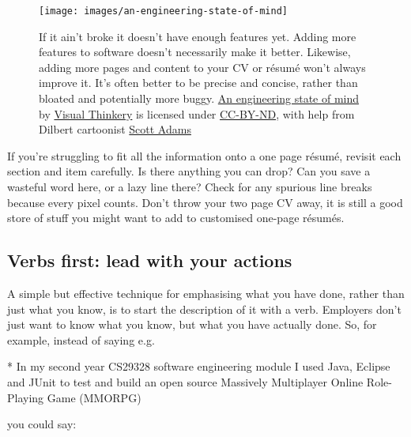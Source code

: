 \documentclass[
]{book}
\newenvironment{Shaded}{\begin{snugshade}}{\end{snugshade}}
\newcommand{\NormalTok}[1]{#1}
\newcommand{\SpecialStringTok}[1]{\textcolor[rgb]{0.31,0.60,0.02}{#1}}
\begin{document}
\begin{figure}

{\centering \texttt{[image: images/an-engineering-state-of-mind]} 

}

\caption{If it ain't broke it doesn't have enough features yet. Adding more features to software doesn't necessarily make it better. Likewise, adding more pages and content to your CV or résumé won't always improve it. It's often better to be precise and concise, rather than bloated and potentially more buggy. \href{https://bryanmmathers.com/an-engineering-state-of-mind/}{An engineering state of mind} by \href{https://visualthinkery.com/}{Visual Thinkery} is licensed under \href{https://creativecommons.org/licenses/by-nd/4.0/}{CC-BY-ND}, with help from Dilbert cartoonist \href{https://en.wikipedia.org/wiki/Scott_Adams}{Scott Adams}}\label{fig:morefeatures-fig}
\end{figure}



If you're struggling to fit all the information onto a one page résumé, revisit each section and item carefully. Is there anything you can drop? Can you save a wasteful word here, or a lazy line there? Check for any spurious line breaks because every pixel counts. Don't throw your two page CV away, it is still a good store of stuff you might want to add to customised one-page résumés.

\hypertarget{verbsfirst}{%
\subsection{Verbs first: lead with your actions}\label{verbsfirst}}

A simple but effective technique for emphasising what you have done, rather than just what you know, is to start the description of it with a verb. Employers don't just want to know what you know, but what you have actually done. So, for example, instead of saying e.g.

\begin{Shaded}
\begin{Highlighting}[]
\SpecialStringTok{* }\NormalTok{In my second year CS29328 software engineering module I used Java, Eclipse and JUnit to test and build an open source Massively Multiplayer Online Role{-}Playing Game (MMORPG)}
\end{Highlighting}
\end{Shaded}

you could say:
\end{document}
